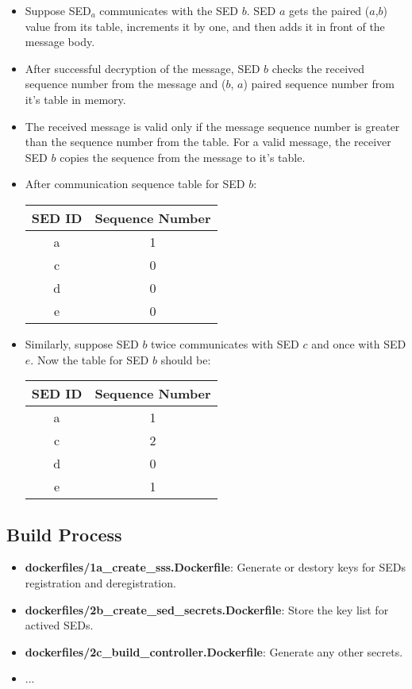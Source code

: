\documentclass[11pt,oneside,onecolumn,letterpaper]{article}
\begin{document}
\begin{itemize}
  \item Suppose SED$_a$ communicates with the SED $b$. SED $a$ gets the 
  paired ($a$,$b$) value from its table, increments it by one, and then adds it in front of the message body. 
  \item After successful decryption of the message, SED $b$ checks the received sequence number from the message and ($b$, $a$) paired sequence number from it's table in memory.
  \item The received message is valid only if the message sequence number is greater than the sequence number from the table. For a valid message, the receiver SED $b$ copies the sequence from the message to it's table.
  \item After communication sequence table for SED $b$:
    \begin{center}
  \begin{tabular}{ |c|c| } 
   \hline
  \textbf{SED ID} & \textbf{Sequence Number} \\
 	\hline \hline
 	a & 1 \\ 
	c & 0  \\ 
 	d & 0 \\ 
 	e & 0 \\ 
	 \hline
\end{tabular}
\end{center}
\item Similarly, suppose SED $b$ twice communicates with SED $c$ and once with SED $e$. Now the table for SED $b$ should be:
   \begin{center}
  \begin{tabular}{ |c|c| } 
   \hline
  \textbf{SED ID} & \textbf{Sequence Number} \\
 	\hline \hline
 	a & 1 \\ 
	c & 2  \\ 
 	d & 0 \\ 
 	e & 1 \\ 
	 \hline
\end{tabular}
\end{center}
    \end{itemize}


\subsection{Build Process}

  \begin{itemize}
    \item \textbf{dockerfiles/1a\_create\_sss.Dockerfile}: Generate or destory keys for SEDs registration and deregistration.
    \item \textbf{dockerfiles/2b\_create\_sed\_secrets.Dockerfile}: Store the key list for actived SEDs.
    \item \textbf{dockerfiles/2c\_build\_controller.Dockerfile}: Generate any other secrets.
    \item ...
  \end{itemize}
\end{document}
